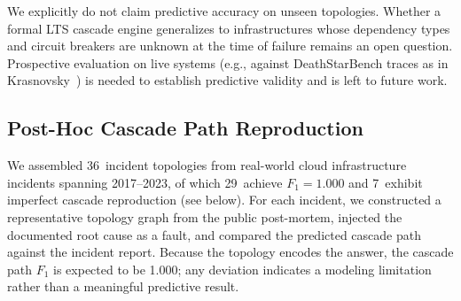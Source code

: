 \documentclass[10pt,twocolumn]{article}
\begin{document}
We explicitly do not claim predictive accuracy on unseen
topologies. Whether a formal LTS cascade engine generalizes
to infrastructures whose dependency types and circuit breakers
are unknown at the time of failure remains an open question.
Prospective evaluation on live systems (e.g., against
DeathStarBench traces as in Krasnovsky~\cite{krasnovsky2026})
is needed to establish predictive validity and is left to
future work.

\subsection{Post-Hoc Cascade Path Reproduction}

We assembled 36~incident topologies from real-world cloud
infrastructure incidents spanning 2017--2023, of which 29~achieve
$F_1 = 1.000$ and 7~exhibit imperfect cascade reproduction
(see below). For each incident, we constructed a representative
topology graph from the public post-mortem, injected the documented
root cause as a fault, and compared the predicted cascade path
against the incident report. Because the topology encodes the
answer, the cascade path $F_1$ is expected to be 1.000; any
deviation indicates a modeling limitation rather than a meaningful
predictive result.
\end{document}
